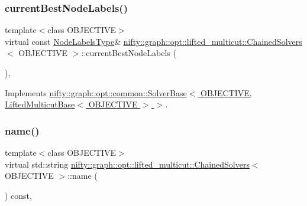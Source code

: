 \subsubsection{\texorpdfstring{current\+Best\+Node\+Labels()}{currentBestNodeLabels()}}
{\footnotesize\ttfamily template$<$class O\+B\+J\+E\+C\+T\+I\+VE$>$ \\
virtual const \hyperlink{classnifty_1_1graph_1_1opt_1_1lifted__multicut_1_1ChainedSolvers_a8c2130c9b1a596d14098018c54b8f976}{Node\+Labels\+Type}\& \hyperlink{classnifty_1_1graph_1_1opt_1_1lifted__multicut_1_1ChainedSolvers}{nifty\+::graph\+::opt\+::lifted\+\_\+multicut\+::\+Chained\+Solvers}$<$ O\+B\+J\+E\+C\+T\+I\+VE $>$\+::current\+Best\+Node\+Labels (\begin{DoxyParamCaption}{ }\end{DoxyParamCaption})\hspace{0.3cm}{\ttfamily [inline]}, {\ttfamily [virtual]}}



Implements \hyperlink{classnifty_1_1graph_1_1opt_1_1common_1_1SolverBase_a7bbe01ee201cf3157b251e54c5ff0619}{nifty\+::graph\+::opt\+::common\+::\+Solver\+Base$<$ O\+B\+J\+E\+C\+T\+I\+V\+E, Lifted\+Multicut\+Base$<$ O\+B\+J\+E\+C\+T\+I\+V\+E $>$ $>$}.

\mbox{\label{classnifty_1_1graph_1_1opt_1_1lifted__multicut_1_1ChainedSolvers_af1a1069a6d390a04f9ac547600ea09e3}} 
\subsubsection{\texorpdfstring{name()}{name()}}
{\footnotesize\ttfamily template$<$class O\+B\+J\+E\+C\+T\+I\+VE$>$ \\
virtual std\+::string \hyperlink{classnifty_1_1graph_1_1opt_1_1lifted__multicut_1_1ChainedSolvers}{nifty\+::graph\+::opt\+::lifted\+\_\+multicut\+::\+Chained\+Solvers}$<$ O\+B\+J\+E\+C\+T\+I\+VE $>$\+::name (\begin{DoxyParamCaption}{ }\end{DoxyParamCaption}) const\hspace{0.3cm}{\ttfamily [inline]}, {\ttfamily [virtual]}}



